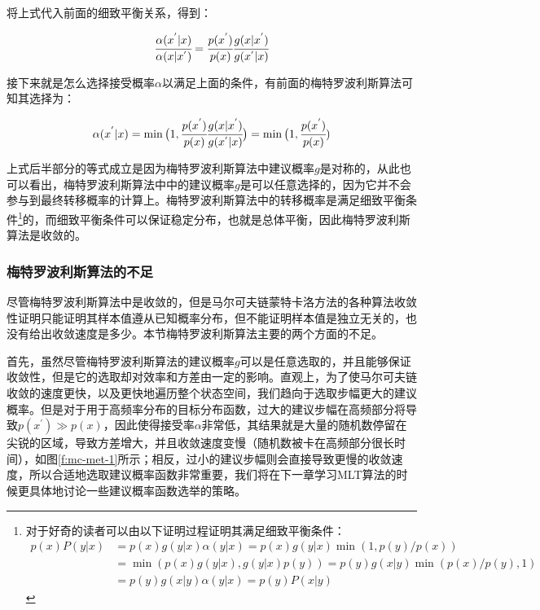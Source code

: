 \noindent 将上式代入前面的细致平衡关系，得到：

\begin{equation}
	 \cfrac{\alpha(x^{'}|x)}{\alpha(x|x^{'})}= \cfrac{p(x^{'})}{p(x)} \cfrac{g(x|x^{'})}{g(x^{'}|x)}
\end{equation}

\noindent 接下来就是怎么选择接受概率$\alpha$以满足上面的条件，有前面的梅特罗波利斯算法可知其选择为：

\begin{equation}
	\alpha(x^{'}|x)=\min \big( 1, \cfrac{p(x^{'})}{p(x)} \cfrac{g(x|x^{'})}{g(x^{'}|x)}\big)=\min\big(1, \cfrac{p(x^{'})}{p(x)})
\end{equation}

\noindent 上式后半部分的等式成立是因为梅特罗波利斯算法中建议概率$g$是对称的，从此也可以看出，梅特罗波利斯算法中中的建议概率$g$是可以任意选择的，因为它并不会参与到最终转移概率的计算上。梅特罗波利斯算法中的转移概率是满足细致平衡条件\footnote{对于好奇的读者可以由以下证明过程证明其满足细致平衡条件：
\begin{equation}
	\begin{aligned}
		p(x)P(y|x)&=p(x)g(y|x)\alpha(y|x)=p(x)g(y|x)\min(1,p(y)/p(x))\\
		&=\min(p(x)g(y|x),g(y|x)p(y))=p(y)g(x|y)\min(p(x)/p(y),1)\\
		&=p(y)g(x|y)\alpha(y|x)=p(y)P(x|y)
	\end{aligned}
\end{equation}
}的，而细致平衡条件可以保证稳定分布，也就是总体平衡，因此梅特罗波利斯算法是收敛的。





\subsubsection{梅特罗波利斯算法的不足}
尽管梅特罗波利斯算法中是收敛的，但是马尔可夫链蒙特卡洛方法的各种算法收敛性证明只能证明其样本值遵从已知概率分布，但不能证明样本值是独立无关的，也没有给出收敛速度是多少。本节梅特罗波利斯算法主要的两个方面的不足。

首先，虽然尽管梅特罗波利斯算法的建议概率$g$可以是任意选取的，并且能够保证收敛性，但是它的选取却对效率和方差由一定的影响。直观上，为了使马尔可夫链收敛的速度更快，以及更快地遍历整个状态空间，我们趋向于选取步幅更大的建议概率。但是对于用于高频率分布的目标分布函数，过大的建议步幅在高频部分将导致$p(x^{'})\gg p(x)$，因此使得接受率$\alpha$非常低，其结果就是大量的随机数停留在尖锐的区域，导致方差增大，并且收敛速度变慢（随机数被卡在高频部分很长时间），如图\ref{f:mc-met-1}所示；相反，过小的建议步幅则会直接导致更慢的收敛速度，所以合适地选取建议概率函数非常重要，我们将在下一章学习MLT算法的时候更具体地讨论一些建议概率函数选举的策略。

